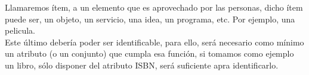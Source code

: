 Llamaremos ítem, a un elemento que es aprovechado por las personas, dicho ítem puede ser, un objeto, un servicio, una idea, un programa, etc.  Por ejemplo, una pelicula.\\
Este último debería poder ser identificable, para ello, será necesario como mínimo un atributo (o un conjunto) que cumpla esa función,  si tomamos como ejemplo un libro, sólo disponer del atributo ISBN, será suficiente apra identificarlo.\\